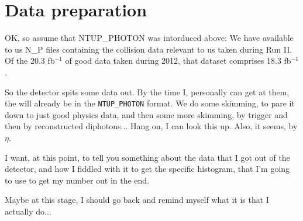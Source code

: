 \chapter{Data preparation}

OK, so assume that NTUP\_PHOTON was intorduced above: We have available to us N\_P files containing the collision data relevant to us taken during Run II. Of the 20.3 fb$^{-1}$ of good data taken during 2012, that dataset comprises 18.3 fb$^{-1}$.

So the detector spits some data out. By the time I, personally can get at them, the will already be in the \texttt{NTUP\_PHOTON} format. We do some skimming, to pare it down to just good physics data, and then some more skimming, by trigger and then by reconstructed diphotons... Hang on, I can look this up. Also, it seems, by $\eta$.

I want, at this point, to tell you something about the data that I got out of the detector, and how I fiddled with it to get the specific histogram, that I'm going to use to get my number out in the end.

Maybe at this stage, I should go back and remind myself what it is that I actually do...

